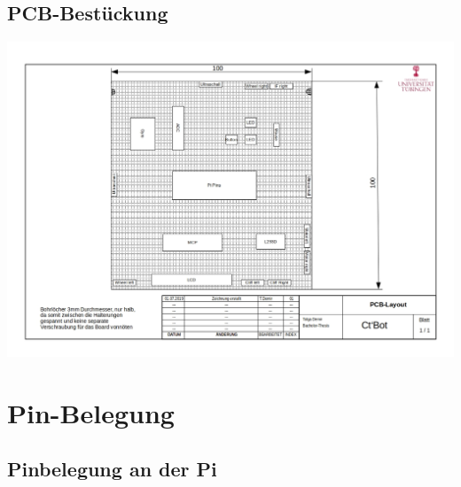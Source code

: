 \documentclass[twoside,12pt,a4paper]{report}
\begin{document}
	\section{PCB-Bestückung}
	\includegraphics[angle=90,origin=c, scale= 0.7]{images/PCB-Layout.jpg}
	
	\chapter{Pin-Belegung}
	\section{Pinbelegung an der Pi}
	
\end{document}
